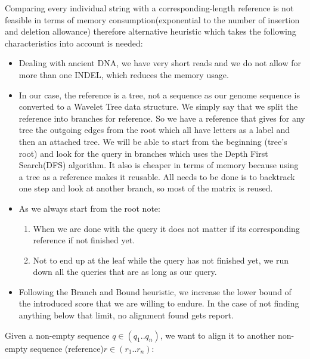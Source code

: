 \documentclass[11pt,a4paper]{report}
\begin{document}
Comparing every individual string with a corresponding-length reference is not feasible in
terms of memory consumption(exponential to the number of insertion and deletion allowance) 
therefore alternative heuristic which takes the following characteristics into account is needed: 


\begin{itemize}

\item Dealing with ancient DNA, we have very short reads and we do not allow for 
more than one INDEL, which reduces the memory usage.\\

\item 
In our case, the reference is a tree, not a sequence as our genome sequence is 
converted to a Wavelet Tree data structure.
We simply say that we split the reference into branches for reference. So we have
a reference that gives for any tree the outgoing edges from the root which all have 
letters  as a label and then an attached tree.
We will be able to start from the beginning (tree's root) and look for the query in 
branches which uses the Depth First Search(DFS) algorithm. 
It also is cheaper in terms of memory because using a tree as a reference makes
it reusable.
All needs to be done is to backtrack one step and look at another branch, so most
of the matrix is reused.\\


\item
As we always start from the root note:
\begin{enumerate}
 \item When we are done with the query it does not matter if its corresponding 
 reference if not finished yet.
 
 \item Not to end up at the leaf while the query has not finished yet,
we run down all the queries that are as long as our query.

\end{enumerate}

 \item Following the Branch and Bound heuristic, we increase the lower bound of the 
 introduced score that we are willing to endure. In the case of not finding anything 
 below that limit, no alignment found gets report.
 
\end{itemize}
Given a non-empty sequence $q\in (q_{1}..q_{n})$, we want to align it to 
another non-empty sequence (reference)$r\in (r_{1}..r_{n})$:\\\\
\end{document}
